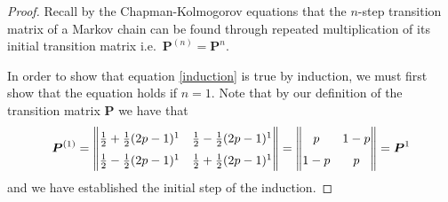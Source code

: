 \begin{proof}
  Recall by the Chapman-Kolmogorov equations that the $n$-step transition matrix
  of a Markov chain can be found through repeated multiplication of its initial
  transition matrix i.e.\ $\boldsymbol{P}^{(n)} = \boldsymbol{P}^n$.

  In order to show that equation \eqref{induction} is true by induction, we must
  first show that the equation holds if $n=1$. Note that by our definition of the transition matrix $\boldsymbol{P}$ we have that
  \begin{align*}
    \renewcommand\arraystretch{1.5}
    \boldsymbol{P}^{(1)} =
    \begin{Vmatrix}
      \frac{1}{2} + \frac{1}{2}(2p - 1)^{1} & \frac{1}{2} - \frac{1}{2}(2p - 1)^{1}  \\
      \frac{1}{2} - \frac{1}{2}(2p - 1)^{1} & \frac{1}{2} + \frac{1}{2}(2p - 1)^{1} \\
    \end{Vmatrix} =
    \begin{Vmatrix}
      p    & 1-p \\
      1-p  & p   \\
    \end{Vmatrix} = \boldsymbol{P}^{1}
  \end{align*}
  and we have established the initial step of the induction.


\end{proof}
